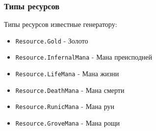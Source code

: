 \subsubsection{Типы ресурсов}
\label{resourceTypes}
Типы ресурсов известные генератору:
\begin{itemize}
\item \texttt{Resource.Gold} - Золото
\item \texttt{Resource.InfernalMana} - Мана преисподней
\item \texttt{Resource.LifeMana} - Мана жизни
\item \texttt{Resource.DeathMana} - Мана смерти
\item \texttt{Resource.RunicMana} - Мана рун
\item \texttt{Resource.GroveMana} - Мана рощи
\end{itemize}
